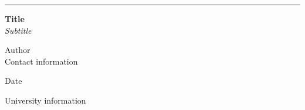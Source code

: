 \begin{titlepage}
  \raggedleft
  \rule{1pt}{\textheight}
  \hspace{0.05\textwidth}
  \parbox[b]{0.75\textwidth}{
    {\huge\bfseries\flushleft Title}\\[2\baselineskip]
    {\large\textit{Subtitle}}

    \vspace{2cm}

    {\large Author}\\
    {\small Contact information}

    \vspace{1cm}

    Date

    \vspace{0.35\textheight}

    University information

    \vspace{0.25cm}
  }
\end{titlepage}

